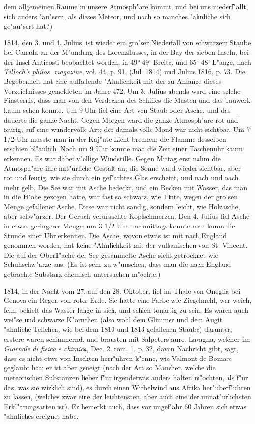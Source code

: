 \documentclass[a4paper, 11pt, oneside, polutonikogreek, german]{article}
\begin{document}
dem allgemeinen Raume in unsere Atmosph"are kommt, und bei uns niederf"allt, sich anders "au"sern, als dieses Meteor, und noch so manches "ahnliche sich ge"au"sert hat?)

1814, den 3. und 4. Julius, ist wieder ein gro"ser Niederfall von schwarzem Staube bei Canada an der M"undung des Lorenzflusses, in der Bay der sieben Inseln, bei der Insel Anticosti beobachtet worden, in 49° 49' Breite, und 65° 48' L"ange, nach \emph{Tilloch's philos. magazine}, vol. 44, p. 91, (Jul. 1814) und Julius 1816, p. 73. Die Begebenheit hat eine auffallende "Ahnlichkeit mit der zu Anfange dieses Verzeichnisses gemeldeten im Jahre 472. Um 3. Julius abends ward eine solche Finsternis, dass man von den Verdecken des Schiffes die Masten und das Tauwerk kaum sehen konnte. Um 9 Uhr fiel eine Art von Staub oder Asche, und das dauerte die ganze Nacht. Gegen Morgen ward die ganze Atmosph"are rot und feurig, auf eine wundervolle Art; der damals volle Mond war nicht sichtbar. Um 7 1/2 Uhr musste man in der Kaj"ute Licht brennen; die Flamme desselben erschien bl"aulich. Noch um 9 Uhr konnte man die Zeit einer Taschenuhr kaum erkennen. Es war dabei v"ollige Windstille. Gegen Mittag erst nahm die Atmosph"are ihre nat"urliche Gestalt an; die Sonne ward wieder sichtbar, aber rot und feurig, wie sie durch ein gef"arbtes Glas erscheint, und nach und nach mehr gelb. Die See war mit Asche bedeckt, und ein Becken mit Wasser, das man in die H"ohe gezogen hatte, war fast so schwarz, wie Tinte, wegen der gro"sen Menge gefallener Asche. Diese war nicht sandig, sondern leicht, wie Holzasche, aber schw"arzer. Der Geruch verursachte Kopfschmerzen. Den 4. Julius fiel Asche in etwas geringerer Menge; um 3 1/2 Uhr nachmittags konnte man kaum die Stunde einer Uhr erkennen. Die Asche, wovon etwas ist mit nach England genommen worden, hat keine "Ahnlichkeit mit der vulkanischen von St. Vincent. Die auf der Oberfl"ache der See gesammelte Asche sieht getrocknet wie Schuhschw"arze aus. (Es ist sehr zu w"unschen, dass man die nach England gebrachte Substanz chemisch untersuchen m"ochte.)

1814, in der Nacht vom 27. auf den 28. Oktober, fiel im Thale von Oneglia bei Genova ein Regen von roter Erde. Sie hatte eine Farbe wie Ziegelmehl, war weich, fein, behielt das Wasser lange in sich, und schien tonartig zu sein. Es waren auch wei"se und schwarze K"ornchen (also wohl dem Glimmer und dem Augit "ahnliche Teilchen, wie bei dem 1810 und 1813 gefallenen Staube) darunter; erstere waren schimmernd, und brausten mit Salpeters"aure. Lavagna, welcher im \emph{Giornale di fisica e chimica}, Dec. 2. tom. 1. p. 32, davon Nachricht gibt, sagt, dass es nicht etwa von Insekten herr"uhren k"onne, wie Valmont de Bomare geglaubt hat; er ist aber geneigt (nach der Art so Mancher, welche die meteorischen Substanzen lieber f"ur irgendetwas anders halten m"ochten, als f"ur das, was sie wirklich sind), es durch einen Wirbelwind aus Afrika her"uberf"uhren zu lassen, (welches zwar eine der leichtensten, aber auch eine der unnat"urlichsten Erkl"arungsarten ist). Er bemerkt auch, dass vor ungef"ahr 60 Jahren sich etwas "ahnliches ereignet habe.
\end{document}

